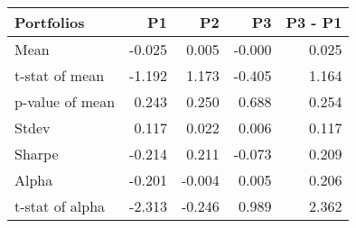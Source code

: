 \begin{tabular}{lrrrr}
\toprule
Portfolios & P1 & P2 & P3 & P3 - P1 \\
\midrule
Mean & -0.025 & 0.005 & -0.000 & 0.025 \\
t-stat of mean & -1.192 & 1.173 & -0.405 & 1.164 \\
p-value of mean & 0.243 & 0.250 & 0.688 & 0.254 \\
Stdev & 0.117 & 0.022 & 0.006 & 0.117 \\
Sharpe & -0.214 & 0.211 & -0.073 & 0.209 \\
Alpha & -0.201 & -0.004 & 0.005 & 0.206 \\
t-stat of alpha & -2.313 & -0.246 & 0.989 & 2.362 \\
\bottomrule
\end{tabular}
